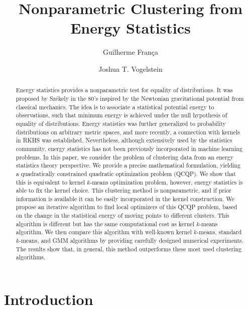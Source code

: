 \documentclass[aps,preprint,nofootinbib,floatfix]{revtex4-1}
\begin{document}
\title{Nonparametric Clustering from  Energy Statistics}

\author{Guilherme Fran\c ca}

\author{Joshua T. Vogelstein}



\begin{abstract}
Energy statistics provides a nonparametric test for equality of distributions.
It was proposed by 
Sz\' ekely in the 80's
inspired by the Newtonian gravitational potential from classical mechanics. 
The idea
is to associate a statistical potential energy to observations, such that 
minimum energy is achieved under the null hypothesis of equality of 
distributions. Energy statistics
was further generalized to probability 
distributions on arbitrary metric spaces,
and more recently, a connection with kernels in RKHS was established.
Nevertheless, although extensively used by the statistics community, energy
statistics has not been
previously incorporated in machine learning problems.
In this paper, we consider the problem of clustering data from
an energy statistics theory perspective.
We provide a precise mathematical formulation, yielding
a quadratically constrained quadratic optimization problem (QCQP). 
We show that
this is equivalent to kernel $k$-means
optimization problem, however,
energy statistics is able to fix the kernel choice. 
This clustering 
method is nonparametric, and if prior information is available
it can be easily incorporated in the kernel construction.
We propose an iterative algorithm
to find local optimizers of this QCQP problem, based on the change
in the statistical energy 
of moving points to different clusters. This algorithm 
is different but has the same computational cost as kernel $k$-means 
algorithm.
We then compare this algorithm with
well-known kernel $k$-means, standard $k$-means, and GMM algorithms by 
providing carefully designed numerical experiments. The results
show that, in general, this method outperforms
these most used clustering algorithms.
\end{abstract}

\maketitle

\section{Introduction}
\end{document}
